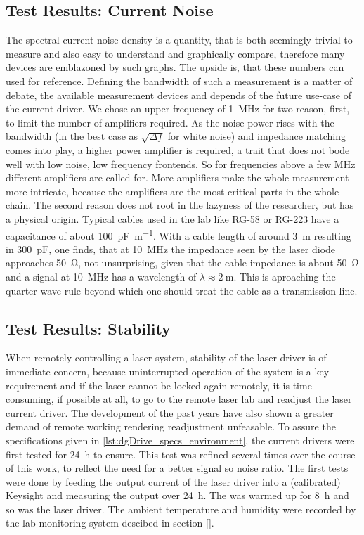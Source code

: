 \subsection{Test Results: Current Noise}
\label{sec:results_current_noise}
The spectral current noise density is a quantity, that is both seemingly trivial to measure and also easy to understand and graphically compare, therefore many devices are emblazoned by such graphs. The upside is, that these numbers can used for reference. Defining the bandwidth of such a measurement is a matter of debate, the available measurement devices and depends of the future use-case of the current driver. We chose an upper frequency of \qty{1}{\MHz} for two reason, first, to limit the number of amplifiers required. As the noise power rises with the bandwidth (in the best case as $\sqrt{\Delta f}$ for white noise) and impedance matching comes into play, a higher power amplifier is required, a trait that does not bode well with low noise, low frequency frontends. So for frequencies above a few \unit{\MHz} different amplifiers are called for. More amplifiers make the whole measurement more intricate, because the amplifiers are the most critical parts in the whole chain. The second reason does not root in the lazyness of the researcher, but has a physical origin. Typical cables used in the lab like RG-58 or RG-223 have a capacitance of about \qty{100}{\pF \per \m}. With a cable length of around \qty{3}{\m} resulting in \qty{300}{\pF}, one finds, that at \qty{10}{\MHz} the impedance seen by the laser diode approaches \qty{50}{\ohm}, not unsurprising, given that the cable impedance is about \qty{50}{\ohm} and a signal at \qty{10}{\MHz} has a wavelength of $\lambda \approx \qty{2}{\m}$. This is aproaching the quarter-wave rule beyond which one should treat the cable as a transmission line.

\clearpage
\subsection{Test Results: Stability}
\label{sec:results_stability}
When remotely controlling a laser system, stability of the laser driver is of immediate concern, because uninterrupted operation of the system is a key requirement and if the laser cannot be locked again remotely, it is time consuming, if possible at all, to go to the remote laser lab and readjust the laser current driver. The development of the past years have also shown a greater demand of remote working rendering readjustment unfeasable. To assure the specifications given in \ref{lst:dgDrive_specs_environment}, the current drivers were first tested for \qty{24}{\hour} to ensure. This test was refined several times over the course of this work, to reflect the need for a better signal so noise ratio. The first tests were done by feeding the output current of the laser driver into a (calibrated) Keysight  and measuring the output over \qty{24}{\hour}. The  was warmed up for \qty{8}{\hour} and so was the laser driver. The ambient temperature and humidity were recorded by the lab monitoring system descibed in section \ref{}.


